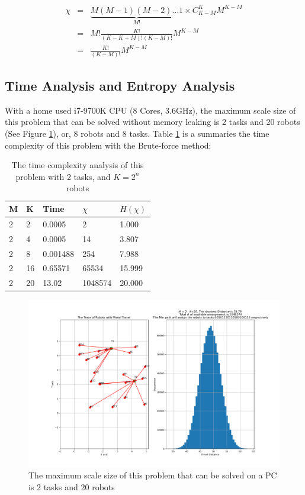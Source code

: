 \begin{equation}
\begin{array}{*{20}{c}}
\chi & = &{\underbrace {M\left( {M - 1} \right)\left( {M - 2} \right) \ldots 1}_{M!} \times C_{K - M}^K{M^{K - M}}}\\
{}& = &{M!\frac{{K!}}{{\left( {K - K + M} \right)!\left( {K - M} \right)!}}{M^{K - M}}}\\
{}& = &{\frac{{K!}}{{\left( {K - M} \right)!}}{M^{K - M}}}
\end{array}
\end{equation}

\subsection{Time Analysis and Entropy Analysis}
With a home used i7-9700K CPU (8 Cores, 3.6GHz), the maximum scale size of this problem that can be solved without memory leaking is 2 tasks and 20 robots (See Figure \ref{fig:upperlimit}), or, 8 robots and 8 tasks. Table \ref{tab:bruteforce} is a summaries the time complexity of this problem with the Brute-force method:

\begin{table}[]
    \centering
\begin{tabular}{|l|l|l|l|l|}
\hline
M & K  & Time     & $\chi$       & $H(\chi)$ \\ \hline
2 & 2  & 0.0005   & 2       &  1.000 \\ \hline
2 & 4  & 0.0005   & 14      &  3.807 \\ \hline
2 & 8  & 0.001488 & 254     &  7.988 \\ \hline
2 & 16 & 0.65571  & 65534   &  15.999 \\ \hline
2 & 20 & 13.02    & 1048574 &   20.000\\ \hline
\end{tabular}
    \caption{The time complexity analysis of this problem with 2 tasks, and $K = 2^n$ robots}
    \label{tab:bruteforce}
\end{table}

\begin{figure}[h!]
  \centering
  \includegraphics[width=15cm]{Pictures/220.png}
  \caption{The maximum scale size of this problem that can be solved on a PC is 2 tasks and 20 robots}
  \label{fig:upperlimit}
  \Description{}
\end{figure}